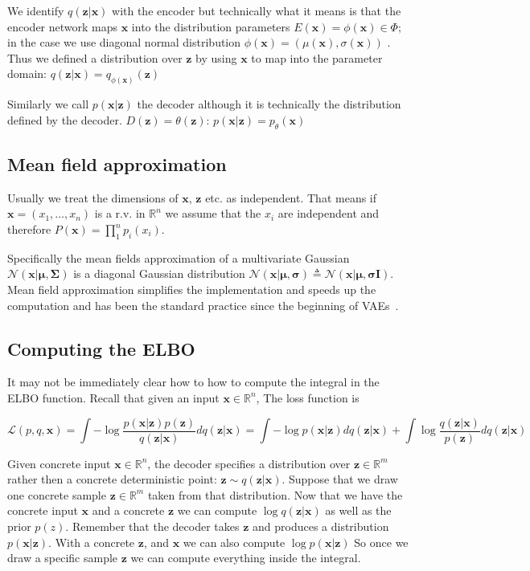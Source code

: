 \documentclass[11pt, a4paper]{report}
\theoremstyle{plain}
\theoremstyle{definition}
\theoremstyle{remark}
\newcommand{\R}{\mathbb{R}}
\newcommand{\x}{\mathbf{x}}
\newcommand{\z}{\mathbf{z}}
\newcommand{\LL}{\mathcal{L}}
\newcommand{\NN}{\mathcal{N}}
\newcommand{\bv}[1]{\boldsymbol{#1}}
\begin{document}
We identify $q(\z | \x)$ with the encoder but technically what it means is that 
the encoder network maps $\x$ into the distribution parameters $E(\x) = \phi(\x)
\in \Phi$;
in the case we use diagonal normal distribution $\phi(\x) = (\mu(\x), \sigma(\x))$
. Thus we defined a distribution over $\z$ by using $\x$ to map into
the parameter domain: $q(\z | \x) = q_{\phi(\x)}(\z)$

Similarly we call $p(\x | \z)$ the decoder although it is
technically the distribution defined by the decoder. $D(\z) = \theta(\z)$:
$p(\x | \z) = p_{\theta}(\x)$


\subsection{Mean field approximation}
Usually we treat the dimensions of $\x$, $\z$ etc. as independent.
That means if $\x = (x_1, \dots, x_n)$ is a r.v. in $\R^n$ 
we assume that the $x_i$ are independent and therefore 
$P(\x) = \prod_1^n p_i(x_i)$.

Specifically the mean fields approximation of a multivariate Gaussian
$\NN(\x | \bv{\mu}, \bv{\Sigma})$ is a diagonal Gaussian 
distribution 
$\NN(\x | \bv{\mu}, \bv{\sigma})
\triangleq \NN(\x | \bv{\mu}, \bv{\sigma}\bv{I})$.
Mean field approximation simplifies the implementation and speeds up the
computation and has been the standard practice since the
beginning of VAEs~\cite{kingma2013auto}.


\subsection{Computing the ELBO}
It may not be immediately clear how to how to compute the integral in the ELBO function. 
Recall that given an input $\x \in \R^n$,
The loss function is 

\begin{equation}
\LL(p,q,\x) = 
\int - \log \frac{p(\x|\z)p(\z)}{q(\z|\x)}dq(\z|\x)
= \int -\log p(\x|\z)dq(\z|\x) + \int \log \frac{q(\z|\x)}{p(\z)}dq(\z|\x)
\label{eq:elbovae}
\end{equation}

Given concrete input $\x \in \R^n$,
the decoder specifies a distribution over
$\z \in \R^m$ rather then a concrete deterministic point:
$\z \sim q(\z | \x)$. Suppose that we draw one concrete sample $\z \in \R^m$
taken from that distribution. Now that we have the concrete input $\x$ and a 
concrete $\z$ we can compute $\log q (\z | \x)$ as well as the prior $p(z)$.
Remember that the decoder takes $\z$ and produces a distribution $p(\x | \z)$.
With a concrete $\z$, and $\x$ we can also compute $\log p(\x | \z)$
So once we draw a specific sample $\z$ we can compute everything inside the
integral.
\end{document}
